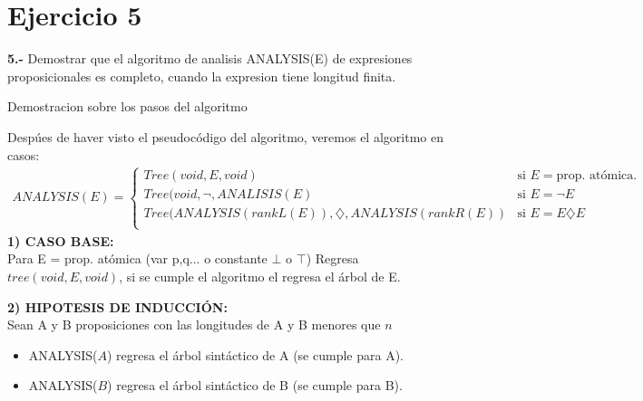 \chapter*{Ejercicio 5}

\textbf{5.-} Demostrar que el algoritmo de analisis ANALYSIS(E) de expresiones proposicionales es completo, cuando la expresion tiene longitud finita. \\
\newline
\begin{center}
    Demostracion sobre los pasos del algoritmo
\end{center}

Despúes de haver visto el pseudocódigo del algoritmo, veremos el algoritmo en casos: \\
\begin{align*}
ANALYSIS(E) = \begin{cases}
    Tree (void,E,void)  & \text{si } E=\text{prop. atómica}. \\
    Tree (void,\neg, ANALISIS(E) & \text{si } E=\neg E \\
    Tree (ANALYSIS(rankL(E)),\diamondsuit,ANALYSIS(rankR(E)) & \text{si } E=E \diamondsuit E \\
\end{cases}
\end{align*}
\newline
\textbf{1) CASO BASE:}\\
\newline
Para E = prop. atómica (var p,q... o constante $\bot$ o $\top$)
Regresa $tree (void,E,void)$, si se cumple el algoritmo el regresa el árbol de E. \\
\newline

\textbf{2) HIPOTESIS DE INDUCCIÓN:}\\
\newline
Sean A y B proposiciones con las longitudes de A y B menores que $n$\\
\begin{itemize}
    \item ANALYSIS($A$) regresa el árbol sintáctico de A (se cumple para A).
    \item ANALYSIS($B$) regresa el árbol sintáctico de B (se cumple para B).
\end{itemize}


